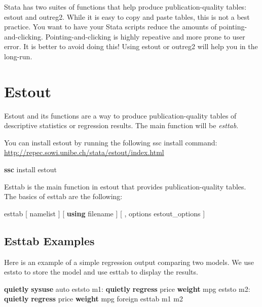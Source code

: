 \documentclass[
]{book}
\newenvironment{Shaded}{\begin{snugshade}}{\end{snugshade}}
\newcommand{\KeywordTok}[1]{\textcolor[rgb]{0.13,0.29,0.53}{\textbf{#1}}}
\newcommand{\NormalTok}[1]{#1}
\begin{document}
Stata has two suites of functions that help produce publication-quality tables: estout and outreg2. While it is easy to copy and paste tables, this is not a best practice. You want to have your Stata scripts reduce the amounts of pointing-and-clicking. Pointing-and-clicking is highly repeative and more prone to user error. It is better to avoid doing this! Using estout or outreg2 will help you in the long-run.

\section{Estout}\label{estout}

Estout and its functions are a way to produce publication-quality tables of descriptive statistics or regression results. The main function will be \emph{esttab}.

You can install estout by running the following ssc install command:
\url{http://repec.sowi.unibe.ch/stata/estout/index.html}

\begin{Shaded}
\begin{Highlighting}[]
\KeywordTok{ssc}\NormalTok{ install estout}
\end{Highlighting}
\end{Shaded}

Esttab is the main function in estout that provides publication-quality tables. The basics of esttab are the following:

\begin{Shaded}
\begin{Highlighting}[]
\NormalTok{esttab [ namelist ] [ }\KeywordTok{using}\NormalTok{ filename ] [ , options estout\_options ]}
\end{Highlighting}
\end{Shaded}

\subsection{Esttab Examples}\label{esttab-examples}

Here is an example of a simple regression output comparing two models. We use eststo to store the model and use esttab to display the results.

\begin{Shaded}
\begin{Highlighting}[]
\KeywordTok{quietly} \KeywordTok{sysuse}\NormalTok{ auto}
\NormalTok{eststo m1: }\KeywordTok{quietly} \KeywordTok{regress}\NormalTok{ price }\KeywordTok{weight}\NormalTok{ mpg}
\NormalTok{eststo m2: }\KeywordTok{quietly} \KeywordTok{regress}\NormalTok{ price }\KeywordTok{weight}\NormalTok{ mpg foreign}
\NormalTok{esttab m1 m2}
\end{Highlighting}
\end{Shaded}
\end{document}
